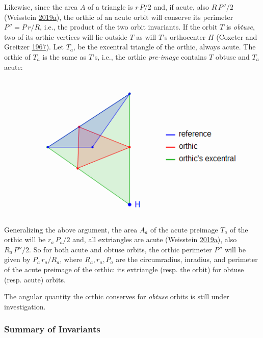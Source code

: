 \documentclass[]{article}
\begin{document}
Likewise, since the area \(A\) of a triangle is \(r\,P/2\) and, if acute, also \(R\,P''/2\) (Weisstein \protect\hyperlink{ref-mw}{2019}\protect\hyperlink{ref-mw}{a}), the orthic of an acute orbit will conserve its perimeter \(P''=P\,r/R\), i.e., the product of the two orbit invariants. If the orbit \(T\) is \emph{obtuse}, two of its orthic vertices will lie outside \(T\) as will \(T\)'s orthocenter \(H\) (Coxeter and Greitzer \protect\hyperlink{ref-coxeter67}{1967}). Let \(T_a\), be the excentral triangle of the orthic, always acute. The orthic of \(T_a\) is the same as \(T\)'s, i.e., the orthic \emph{pre-image} contains \(T\) obtuse and \(T_a\) acute:

\begin{figure}[H]

{\centering \includegraphics[width=0.75\linewidth]{pics/orthic_preimage} 

}

\end{figure}

Generalizing the above argument, the area \(A_a\) of the acute preimage \(T_a\) of the orthic will be \(r_a\,P_a/2\) and, all extriangles are acute (Weisstein \protect\hyperlink{ref-mw}{2019}\protect\hyperlink{ref-mw}{a}), also \(R_a\,P''/2\). So for both acute and obtuse orbits, the orthic perimeter \(P''\) will be given by \(P_a\,r_a/R_a\), where \(R_a,r_a,P_a\) are the circumradius, inradius, and perimeter of the acute preimage of the orthic: its extriangle (resp. the orbit) for obtuse (resp. acute) orbits.

The angular quantity the orthic conserves for \emph{obtuse} orbits is still under investigation.

\hypertarget{summary-of-invariants}{%
\subsubsection{Summary of Invariants}\label{summary-of-invariants}}
\end{document}
